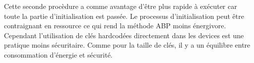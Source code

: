 Cette seconde procèdure a comme avantage d'être plus rapide à exécuter car toute la partie d'initialisation est passée. Le processus d'initialisation peut être contraignant en ressource ce qui rend la méthode ABP moins énergivore. Cependant l'utilisation de clés hardcodées directement dans les devices est une pratique moins sécuritaire. Comme pour la taille de clés, il y a un équilibre entre consommation d'énergie et sécurité.
